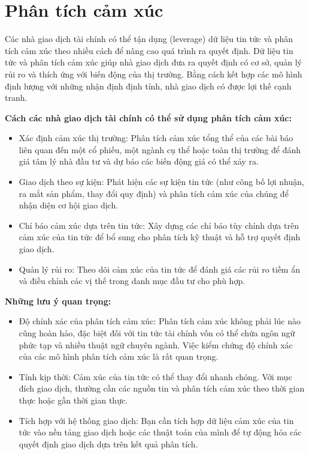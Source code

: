 \section{Phân tích cảm xúc}

Các nhà giao dịch tài chính có thể tận dụng (leverage) dữ liệu tin tức và phân tích cảm xúc theo nhiều cách để nâng cao quá trình ra quyết định. Dữ liệu tin tức và phân tích cảm xúc giúp nhà giao dịch đưa ra quyết định có cơ sở, quản lý rủi ro và thích ứng với biến động của thị trường. Bằng cách kết hợp các mô hình định lượng với những nhận định định tính, nhà giao dịch có được lợi thế cạnh tranh.

\textbf{Cách các nhà giao dịch tài chính có thể sử dụng phân tích cảm xúc:}

\begin{itemize}
\item
  Xác định cảm xúc thị trường: Phân tích cảm xúc tổng thể của các bài báo liên quan đến một cổ phiếu, một ngành cụ thể hoặc toàn thị trường để đánh giá tâm lý nhà đầu tư và dự báo các biến động giá có thể xảy ra.
\item
  Giao dịch theo sự kiện: Phát hiện các sự kiện tin tức (như công bố lợi nhuận, ra mắt sản phẩm, thay đổi quy định) và phân tích cảm xúc của chúng để nhận diện cơ hội giao dịch.
\item
  Chỉ báo cảm xúc dựa trên tin tức: Xây dựng các chỉ báo tùy chỉnh dựa trên cảm xúc của tin tức để bổ sung cho phân tích kỹ thuật và hỗ trợ quyết định giao dịch.
\item
  Quản lý rủi ro: Theo dõi cảm xúc của tin tức để đánh giá các rủi ro tiềm ẩn và điều chỉnh các vị thế trong danh mục đầu tư cho phù hợp.
\end{itemize}

\textbf{Những lưu ý quan trọng:}

\begin{itemize}
\item
  Độ chính xác của phân tích cảm xúc: Phân tích cảm xúc không phải lúc nào cũng hoàn hảo, đặc biệt đối với tin tức tài chính vốn có thể chứa ngôn ngữ phức tạp và nhiều thuật ngữ chuyên ngành. Việc kiểm chứng độ chính xác của các mô hình phân tích cảm xúc là rất quan trọng.
\item
  Tính kịp thời: Cảm xúc của tin tức có thể thay đổi nhanh chóng. Với mục đích giao dịch, thường cần các nguồn tin và phân tích cảm xúc theo thời gian thực hoặc gần thời gian thực.
\item
  Tích hợp với hệ thống giao dịch: Bạn cần tích hợp dữ liệu cảm xúc của tin tức vào nền tảng giao dịch hoặc các thuật toán của mình để tự động hóa các quyết định giao dịch dựa trên kết quả phân tích.
\end{itemize}

